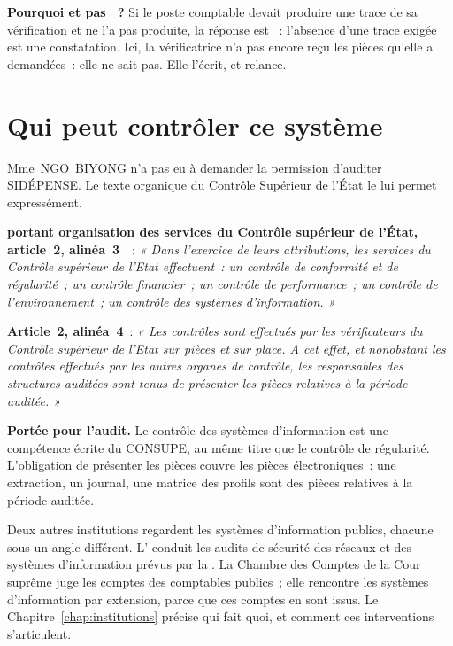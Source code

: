 \begin{boxinfo}
\textbf{Pourquoi \NEK{} et pas \NON{}~?} Si le poste comptable devait
produire une trace de sa vérification et ne l'a pas produite, la réponse
est \NON{}~: l'absence d'une trace exigée est une constatation. Ici, la
vérificatrice n'a pas encore reçu les pièces qu'elle a demandées~: elle ne
sait pas. Elle l'écrit, et relance.
\end{boxinfo}

\separateur

\section{Qui peut contrôler ce système}
\label{sec:pro-mandat}

Mme~NGO~BIYONG n'a pas eu à demander la permission d'auditer SIDÉPENSE.
Le texte organique du Contrôle Supérieur de l'État le lui permet
expressément.

\begin{boxjuris}
\textbf{ portant
organisation des services du Contrôle supérieur de l'État, article~2,
alinéa~3}~\cite{decret2013287consupe}~: \textit{« Dans l'exercice de leurs
attributions, les services du Contrôle supérieur de l'Etat effectuent~:
un contrôle de conformité et de régularité~; un contrôle financier~; un
contrôle de performance~; un contrôle de l'environnement~; un contrôle des
systèmes d'information. »}

\medskip
\textbf{Article~2, alinéa~4}~: \textit{« Les contrôles sont effectués par
les vérificateurs du Contrôle supérieur de l'Etat sur pièces et sur place.
A cet effet, et nonobstant les contrôles effectués par les autres organes
de contrôle, les responsables des structures auditées sont tenus de
présenter les pièces relatives à la période auditée. »}

\medskip
\textbf{Portée pour l'audit.} Le contrôle des systèmes d'information est
une compétence écrite du CONSUPE, au même titre que le contrôle de
régularité. L'obligation de présenter les pièces couvre les pièces
électroniques~: une extraction, un journal, une matrice des profils sont
des pièces relatives à la période auditée.
\end{boxjuris}

Deux autres institutions regardent les systèmes d'information publics,
chacune sous un angle différent. L' conduit les audits de
sécurité des réseaux et des systèmes d'information prévus par la
. La Chambre des Comptes de la Cour suprême juge
les comptes des comptables publics~; elle rencontre les systèmes
d'information par extension, parce que ces comptes en sont issus. Le
Chapitre~\ref{chap:institutions} précise qui fait quoi, et comment ces
interventions s'articulent.

